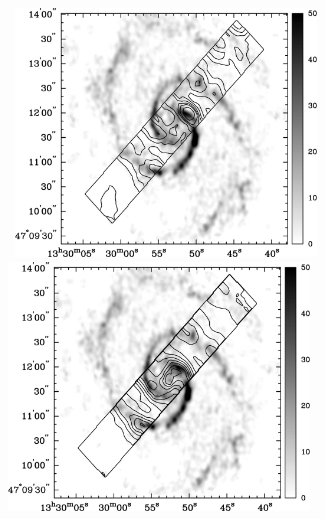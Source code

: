 \documentclass[manuscript]{aastex}
\begin{document}
\begin{figure}[!h]
\centerline{\hbox{ \hspace{0.0in} 
\includegraphics[width=8cm,angle=0]{bw_co_h2s0.jpg}
\hspace{0.1in}
\includegraphics[width=8cm,angle=0]{bw_co_h2s1.jpg}}}
\end{figure}
\end{document}
